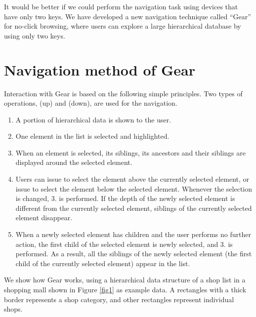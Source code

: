 \documentclass[conference]{IEEEtran}
\def\up{\tsf{▲}}
\def\down{\tsf{▼}}
\begin{document}
It would be better
if we could perform the navigation task using devices that have only two keys.
%
We have developed a new navigation technique called ``{Gear}'' for no-click browsing,
where users can explore a large hierarchical database by using only two keys.


\section{Navigation method of Gear}
\label{navigation}

Interaction with Gear is based on the following simple principles.
Two types of operations,
{\up} (up) and {\down} (down), are used for the navigation.

\begin{enumerate}
\item A portion of hierarchical data is shown to the user.

\item One element in the list is selected and highlighted.


\item When an element is selected, its siblings, its ancestors and their siblings are displayed
around the selected element.

\item Users can issue {\up} to select the element above the currently selected element,
or issue {\down} to select the element below the selected element.
Whenever the selection is changed, 3. is performed.
If the depth of the newly selected element is different from the currently
selected element, siblings of the currently selected element disappear.

\item When a newly selected element has children and the user performs no further action,
the first child of the selected element is newly selected, and 3. is performed.
As a result, all the siblings of the newly selected element
(the first child of the currently selected element) appear in the list.

\end{enumerate}

We show how Gear works, using a hierarchical data structure of
a shop list in a shopping mall shown in Figure \ref{fig1} as example data.
A rectangles with a thick border represents a shop category, and
other rectangles represent individual shops.
\end{document}
